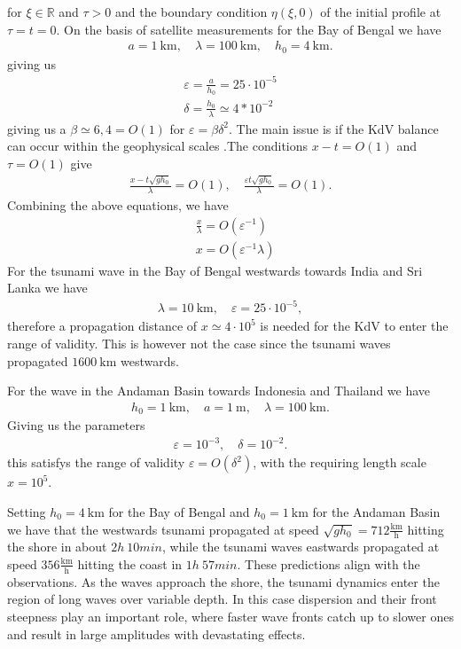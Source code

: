 for $\xi \in \mathbb{R}$ and $\tau > 0 $ and the boundary condition $\eta(\xi
,0)$ of the initial profile at $\tau = t = 0$. On the basis of satellite
measurements for the Bay of Bengal we have
\begin{align}
    a = 1\ \text{km}, \quad \lambda = 100\ \text{km},\quad h_0 = 4\
    \text{km}.
\end{align}
giving us
\begin{align}
    \varepsilon = \frac{a}{h_0} = 25 \cdot 10^{-5}\\
    \delta = \frac{h_0}{\lambda} \simeq 4*10^{-2}
\end{align}
giving us a $\beta \simeq 6,4 = O(1)$ for $\varepsilon = \beta \delta^2$.
The main issue is if the KdV balance can occur within the geophysical scales
.The conditions $x-t = O(1)$ and $\tau = O(1)$ give
\begin{align}
    \frac{x - t \sqrt{gh_0} }{\lambda} = O(1),\quad \frac{\varepsilon t
    \sqrt{gh_0} }{\lambda} = O(1).
\end{align}
Combining the above equations, we have
\begin{align}
   & \frac{x}{\lambda} = O(\varepsilon^{-1})\\
    &x  = O(\varepsilon^{-1}\lambda)
\end{align}
For the tsunami wave in the Bay of Bengal westwards towards India and Sri
Lanka we have
\begin{align}
    \lambda = 10\ \text{km}, \quad \varepsilon = 25 \cdot 10^{-5},
\end{align}
therefore a propagation distance of $x \simeq 4 \cdot 10^{5}$ is needed for
the KdV to enter the range of validity. This is however not the case since
the tsunami waves propagated $1600\ \text{km}$ westwards.

For the wave in the Andaman Basin towards Indonesia and Thailand we have
\begin{align}
    h_0 = 1\ \text{km}, \quad a = 1\ \text{m}, \quad \lambda = 100\
    \text{km}.
\end{align}
Giving us the parameters
\begin{align}
    \varepsilon  = 10^{-3}, \quad \delta = 10^{-2}.
\end{align}
this satisfys the range of validity  $\varepsilon = O(\delta^2)$, with the
requiring length scale $x = 10^{5}$.

Setting $h_0 = 4\ \text{km}$ for the Bay of Bengal and $h_0 = 1\ \text{km}$
for the Andaman Basin we have that the westwards tsunami propagated at speed
$\sqrt{gh_0}  = 712 \frac{\text{km}}{\text{h}}$ hitting the shore in about
$2h\ 10min$, while the tsunami waves eastwards propagated at speed $356
\frac{\text{km}}{\text{h}}$ hitting the coast in $1h\ 57min$. These
predictions align with the observations. As the waves approach the shore, the
tsunami dynamics enter the region of long waves over variable depth. In this
case dispersion and their front steepness play an important role, where
faster wave fronts catch up to slower ones and result in large amplitudes
with devastating effects.








